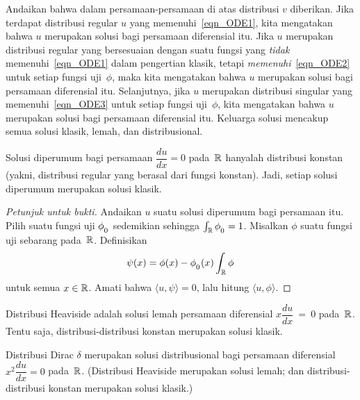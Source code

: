 \begin{defn} Andaikan bahwa dalam persamaan-persamaan di atas distribusi $v$ diberikan. Jika terdapat distribusi regular $u$ yang
memenuhi~\eqref{eqn_ODE1}, kita mengatakan bahwa $u$ merupakan solusi
 bagi persamaan diferensial itu. Jika $u$ merupakan distribusi regular yang bersesuaian dengan suatu fungsi yang
\emph{tidak} memenuhi~\eqref{eqn_ODE1} dalam pengertian klasik, tetapi \emph{memenuhi}~\eqref{eqn_ODE2} untuk setiap fungsi uji~$\phi$,
maka kita mengatakan bahwa $u$ merupakan solusi
 bagi persamaan diferensial itu. Selanjutnya, jika $u$ merupakan distribusi singular yang memenuhi~\eqref{eqn_ODE3} untuk setiap fungsi
uji~$\phi$, kita mengatakan bahwa $u$ merupakan solusi
 bagi persamaan diferensial itu. Keluarga solusi
 mencakup semua solusi klasik, lemah, dan distribusional.
\end{defn}

\begin{exam} Solusi diperumum bagi persamaan $\dfrac{du}{dx} = 0$ pada~$\mathbb{R}$ hanyalah distribusi konstan (yakni,
distribusi regular yang berasal dari fungsi konstan). Jadi, setiap solusi diperumum merupakan solusi klasik.
\end{exam}

\begin{proof}[\emph{Petunjuk untuk bukti}] Andaikan $u$ suatu solusi diperumum bagi persamaan itu. Pilih suatu fungsi uji $\phi_{{}_{\scriptstyle{0}}}$ sedemikian
sehingga $\int_{\mathbb{R}} \phi_{{}_{\scriptstyle{0}}} = 1$. Misalkan $\phi$ suatu fungsi uji sebarang pada~$\mathbb{R}$. Definisikan
   \[ \psi(x) = \phi(x) - \phi_{{}_{\scriptstyle{0}}}(x)\int_{\mathbb{R}} \phi \]
untuk semua $x \in \mathbb{R}$. Amati bahwa $\langle u,\psi \rangle = 0$, lalu hitung $\langle u,\phi \rangle$.  \ns
\end{proof}

\begin{exam} Distribusi Heaviside adalah solusi lemah persamaan diferensial $x\dfrac{du}{dx}~=~0$ pada~$\mathbb{R}$. Tentu saja,
distribusi-distribusi konstan merupakan solusi klasik.
\end{exam}

\begin{exam} Distribusi Dirac $\delta$ merupakan solusi distribusional bagi persamaan diferensial $x^2\dfrac{du}{dx} = 0$ pada~$\mathbb{R}$.
(Distribusi Heaviside merupakan solusi lemah; dan distribusi-distribusi konstan merupakan solusi klasik.)
\end{exam}

